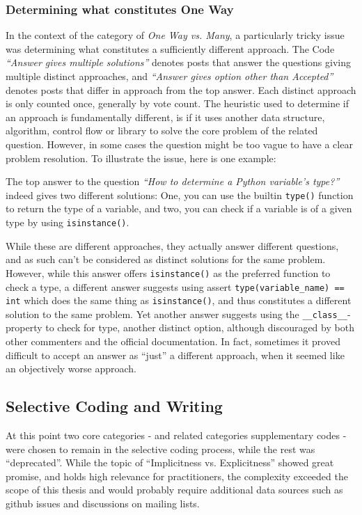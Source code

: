 \subsubsection{Determining what constitutes One Way}
\label{sec:4.3.4}
In the context of the category of \textit{One Way vs. Many}, a particularly tricky issue was determining what constitutes a
sufficiently different approach. The Code \textit{“Answer gives multiple solutions”} denotes posts that answer the questions
giving multiple distinct approaches, and \textit{“Answer gives option other than Accepted”} denotes posts that differ in
approach from the top answer. Each distinct approach is only counted once, generally by vote count. The heuristic
used to determine if an approach is fundamentally different, is if it uses another data structure, algorithm, control
flow or library to solve the core problem of the related question. However, in some cases the question might be too
vague to have a clear problem resolution. To illustrate the issue, here is one example:

The top answer to the question \textit{“How to determine a Python variable’s type?”} indeed gives two different solutions: One,
you can use the builtin \texttt{type()} function to return the type of a variable, and two, you can check if a variable is of a
given type by using \texttt{isinstance()}.

While these are different approaches, they actually answer different questions, and as such can’t be considered as distinct
solutions for the same problem. However, while this answer offers \texttt{isinstance()} as the preferred function to check a type,
a different answer suggests using assert \texttt{type(variable\_name) == int} which does the same thing as \texttt{isinstance()},
and thus constitutes a different solution to the same problem. Yet another answer suggests using the \texttt{\_\_class\_\_}-property
to check for type, another distinct option, although discouraged by both other commenters and the official documentation.
In fact, sometimes it proved difficult to accept an answer as “just” a different approach, when it seemed like an
objectively worse approach.

\subsection{Selective Coding and Writing}

At this point two core categories - and related categories supplementary codes - were chosen to remain in the selective
coding process, while the rest was “deprecated”. While the topic of “Implicitness vs. Explicitness” showed great promise,
and holds high relevance for practitioners, the complexity exceeded the scope of this thesis and would probably require
additional data sources such as github issues and discussions on mailing lists.

